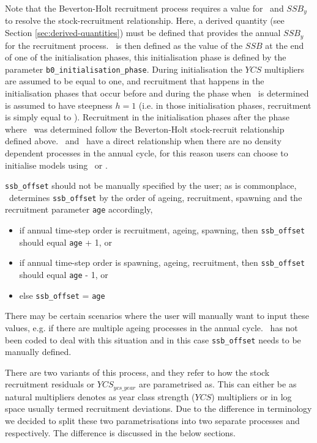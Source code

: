 Note that the Beverton-Holt recruitment process requires a value for \Bzero\ and $SSB_y$ to resolve the stock-recruitment relationship. Here, a derived quantity (see Section \ref{sec:derived-quantities}) must be defined that provides the annual $SSB_y$ for the recruitment process. \Bzero\ is then defined as the value of the $SSB$ at the end of one of the initialisation phases, this initialisation phase is defined by the parameter \texttt{b0\_initialisation\_phase}. During initialisation the $YCS$ multipliers are assumed to be equal to one, and recruitment that happens in the initialisation phases that occur before and during the phase when \Bzero\ is determined is assumed to have steepness $h=1$ (i.e. in those initialisation phases, recruitment is simply equal to \Rzero). Recruitment in the initialisation phases after the phase where \Bzero\ was determined follow the Beverton-Holt stock-recruit relationship defined above. \Rzero\ and \Bzero\ have a direct relationship when there are no density dependent processes in the annual cycle, for this reason users can choose to initialise models using \Bzero\ or \Rzero.

\texttt{ssb\_offset} should not be manually specified by the user; as is commonplace, \CNAME\ determines \texttt{ssb\_offset} by the order of ageing, recruitment, spawning and the recruitment parameter \texttt{age} accordingly,
\begin{itemize}
	\item if annual time-step order is recruitment, ageing, spawning, then \texttt{ssb\_offset} should equal \texttt{age} + 1, or
	\item if annual time-step order is spawning, ageing, recruitment, then \texttt{ssb\_offset} should equal \texttt{age} - 1, or
	\item else \texttt{ssb\_offset} = \texttt{age}
\end{itemize}

There may be certain scenarios where the user will manually want to input these values, e.g. if there are multiple ageing processes in the annual cycle. \CNAME\ has not been coded to deal with this situation and in this case \texttt{ssb\_offset} needs to be manually defined. 

There are two variants of this process, and they refer to how the stock recruitment residuals or $YCS_{ycs\_year}$ are parametrised as. This can either be as natural multipliers denotes as year class strength ($YCS$) multipliers or in log space usually termed recruitment deviations. Due to the difference in terminology we decided to split these two parametrisations into two separate processes  and  respectively. The difference is discussed in the below sections.

